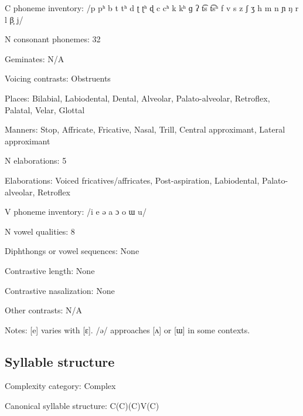 {\begin{appendixdesc}
\item[C phoneme inventory:] /p pʰ b t tʰ d ʈ ʈʰ ɖ c cʰ k kʰ ɡ ʔ t͡s t͡sʰ f v s z ʃ ʒ h m n ɲ ŋ r l β̞ j/

\item[N consonant phonemes:] 32

\item[Geminates:] N/A

\item[Voicing contrasts:] Obstruents

\item[Places:] Bilabial, Labiodental, Dental, Alveolar, Palato-alveolar, Retroflex, Palatal, Velar, Glottal

\item[Manners:] Stop, Affricate, Fricative, Nasal, Trill, Central approximant, Lateral approximant

\item[N elaborations:] 5

\item[Elaborations:] Voiced fricatives/affricates, Post-aspiration, Labiodental, Palato-alveolar, Retroflex

\item[V phoneme inventory:] /i e ə a ɔ o ɯ u/

\item[N vowel qualities:] 8

\item[Diphthongs or vowel sequences:] None

\item[Contrastive length:] None

\item[Contrastive nasalization:] None

\item[Other contrasts:] N/A

\item[Notes:] [e] varies with [ɛ]. /ə/ approaches [ʌ] or [ɯ] in some contexts.
\end{appendixdesc}
\subsection*{Syllable structure}
\begin{appendixdesc}

\item[Complexity category:] Complex

\item[Canonical syllable structure:] C(C)(C)V(C) \citep[30--32]{Plaisier2007}


\end{appendixdesc}}
